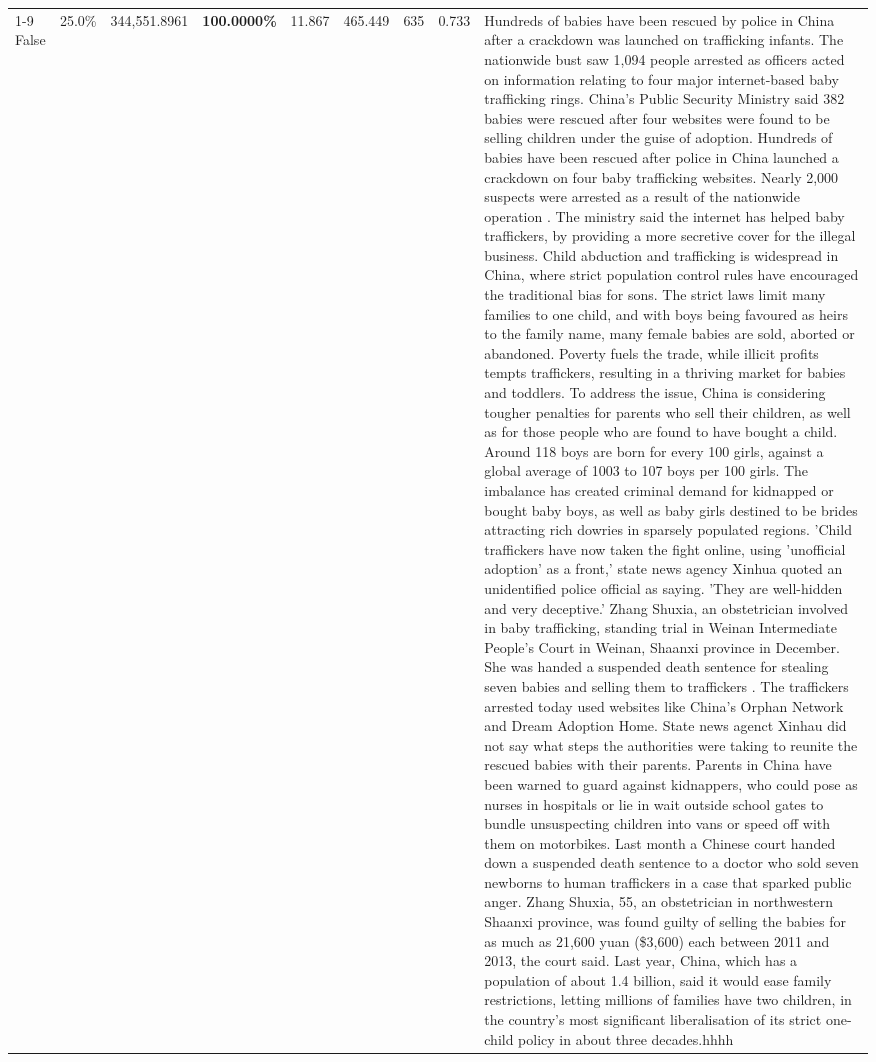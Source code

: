 \begin{table}[H]
\begin{tabular}{lllrlllll}
\cline{1-9}
False & 25.0\% & 344,551.8961 & \bfseries \color{red} 100.0000\% & 11.867 & 465.449 & 635 & 0.733 & Hundreds of babies have been rescued by police in China after a crackdown was launched on trafficking infants. The nationwide bust saw 1,094 people arrested as officers acted on information relating to four major internet-based baby trafficking rings. China's Public Security Ministry said 382 babies were rescued after four websites were found to be selling children under the guise of adoption. Hundreds of babies have been rescued after police in China launched a crackdown on four baby trafficking websites. Nearly 2,000 suspects were arrested as a result of the nationwide operation . The ministry said the internet has helped baby traffickers, by providing a more secretive cover for the illegal business. Child abduction and trafficking is widespread in China, where strict population control rules have encouraged the traditional bias for sons. The strict laws limit many families to one child, and with boys being favoured as heirs to the family name, many female babies are sold, aborted or abandoned. Poverty fuels the trade, while illicit profits tempts traffickers, resulting in a thriving market for babies and toddlers. To address the issue, China is considering tougher penalties for parents who sell their children, as well as for those people who are found to have bought a child. Around 118 boys are born for every 100 girls, against a global average of 1003 to 107 boys per 100 girls. The imbalance has created criminal demand for kidnapped or bought baby boys, as well as baby girls destined to be brides attracting rich dowries in sparsely populated regions. 'Child traffickers have now taken the fight online, using 'unofficial adoption' as a front,' state news agency Xinhua quoted an unidentified police official as saying. 'They are well-hidden and very deceptive.' Zhang Shuxia, an obstetrician involved in baby trafficking, standing trial in Weinan Intermediate People's Court in Weinan, Shaanxi province in December. She was handed a suspended death sentence for stealing seven babies and selling them to traffickers . The traffickers arrested today used websites like China's Orphan Network and Dream Adoption Home. State news agenct Xinhau did not say what steps the authorities were taking to reunite the rescued babies with their parents. Parents in China have been warned to guard against kidnappers, who could pose as nurses in hospitals or lie in wait outside school gates to bundle unsuspecting children into vans or speed off with them on motorbikes. Last month a Chinese court handed down a suspended death sentence to a doctor who sold seven newborns to human traffickers in a case that sparked public anger. Zhang Shuxia, 55, an obstetrician in northwestern Shaanxi province, was found guilty of selling the babies for as much as 21,600 yuan (\$3,600) each between 2011 and 2013, the court said. Last year, China, which has a population of about 1.4 billion, said it would ease family restrictions, letting millions of families have two children, in the country's most significant liberalisation of its strict one-child policy in about three decades.hhhh \\

\end{tabular}
\end{table}
